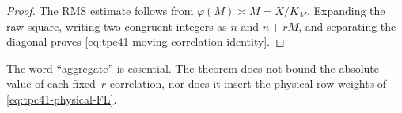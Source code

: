 \begin{proof}
The RMS estimate follows from \(\varphi(M)\asymp M=X/K_M\).  Expanding
the raw square, writing two congruent integers as \(n\) and \(n+rM\),
and separating the diagonal proves
\eqref{eq:tpc41-moving-correlation-identity}.
\end{proof}

The word ``aggregate'' is essential.  The theorem does not bound the
absolute value of each fixed--\(r\) correlation, nor does it insert the
physical row weights of \eqref{eq:tpc41-physical-FL}.
